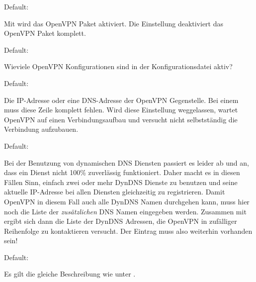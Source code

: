 \begin{description}


  Default: 

  Mit  wird das OpenVPN Paket aktiviert. Die Einstellung
   deaktiviert das OpenVPN Paket komplett.


  Default: 

  Wieviele OpenVPN Konfigurationen sind in der Konfigurationsdatei
  aktiv?


  Default: 

  Die IP-Adresse oder eine DNS-Adresse der OpenVPN Gegenstelle. Bei
  einem  muss diese Zeile komplett
  fehlen.  Wird diese Einstellung weggelassen, wartet OpenVPN auf
  einen Verbindungsaufbau und versucht nicht selbstständig die
  Verbindung aufzubauen.


  Default: 

  Bei der Benutzung von dynamischen DNS Diensten passiert es leider ab
  und an, dass ein Dienst nicht 100\% zuverlässig funktioniert. Daher
  macht es in diesen Fällen Sinn, einfach zwei oder mehr DynDNS
  Dienste zu benutzen und seine aktuelle IP-Adresse bei allen Diensten
  gleichzeitig zu registrieren. Damit OpenVPN in diesem Fall auch alle
  DynDNS Namen durchgehen kann, muss hier noch die Liste der
  \emph{zusätzlichen} DNS Namen eingegeben werden. Zusammen mit
   ergibt sich dann die Liste der DynDNS
  Adressen, die OpenVPN in zufälliger Reihenfolge zu kontaktieren
  versucht. Der Eintrag  muss also
  weiterhin vorhanden sein!


  Default: 

  Es gilt die gleiche Beschreibung wie unter
  .



\end{description}
